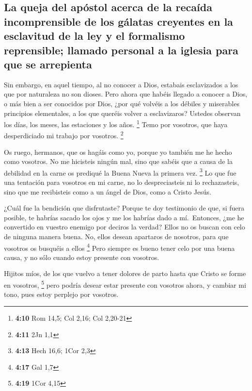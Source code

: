 \hypertarget{la-queja-del-apuxf3stol-acerca-de-la-recauxedda-incomprensible-de-los-guxe1latas-creyentes-en-la-esclavitud-de-la-ley-y-el-formalismo-reprensible-llamado-personal-a-la-iglesia-para-que-se-arrepienta}{%
\subsection{La queja del apóstol acerca de la recaída incomprensible de
los gálatas creyentes en la esclavitud de la ley y el formalismo
reprensible; llamado personal a la iglesia para que se
arrepienta}\label{la-queja-del-apuxf3stol-acerca-de-la-recauxedda-incomprensible-de-los-guxe1latas-creyentes-en-la-esclavitud-de-la-ley-y-el-formalismo-reprensible-llamado-personal-a-la-iglesia-para-que-se-arrepienta}}

 Sin embargo, en aquel tiempo, al no conocer a Dios,
estabais esclavizados a los que por naturaleza no son dioses.
 Pero ahora que habéis llegado a conocer a Dios, o más
bien a ser conocidos por Dios, ¿por qué volvéis a los débiles y
miserables principios elementales, a los que queréis volver a
esclavizaros?  Ustedes observan los días, los meses, las
estaciones y los años. \footnote{\textbf{4:10} Rom 14,5; Col 2,16; Col
  2,20-21}  Temo por vosotros, que haya desperdiciado mi
trabajo por vosotros. \footnote{\textbf{4:11} 2Jn 1,1}

 Os ruego, hermanos, que os hagáis como yo, porque yo
también me he hecho como vosotros. No me hicisteis ningún mal,
 sino que sabéis que a causa de la debilidad en la carne
os prediqué la Buena Nueva la primera vez. \footnote{\textbf{4:13} Hech
  16,6; 1Cor 2,3}  Lo que fue una tentación para vosotros
en mi carne, no lo despreciasteis ni lo rechazasteis, sino que me
recibisteis como a un ángel de Dios, como a Cristo Jesús.

 ¿Cuál fue la bendición que disfrutaste? Porque te doy
testimonio de que, si fuera posible, te habrías sacado los ojos y me los
habrías dado a mí.  \,Entonces, ¿me he convertido en
vuestro enemigo por deciros la verdad?  Ellos no os
buscan con celo de ninguna manera buena. No, ellos desean apartaros de
nosotros, para que vosotros os busquéis a ellos \footnote{\textbf{4:17}
  Gal 1,7}  Pero siempre es bueno tener celo por una
buena causa, y no sólo cuando estoy presente con vosotros.

 Hijitos míos, de los que vuelvo a tener dolores de parto
hasta que Cristo se forme en vosotros, \footnote{\textbf{4:19} 1Cor 4,15}
 pero podría desear estar presente con vosotros ahora, y
cambiar mi tono, pues estoy perplejo por vosotros.

